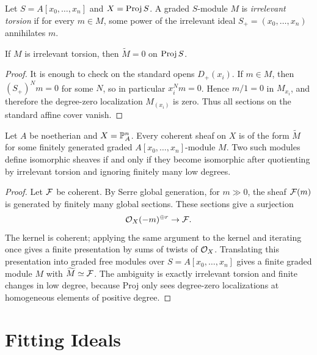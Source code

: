 \begin{definition}
Let \(S=A[x_0,\ldots,x_n]\) and \(X=\operatorname{Proj} S\).  A graded \(S\)-module \(M\) is
\emph{irrelevant torsion} if for every \(m\in M\), some power of the irrelevant
ideal \(S_+=(x_0,\ldots,x_n)\) annihilates \(m\).
\end{definition}

\begin{proposition}
If \(M\) is irrelevant torsion, then \(\widetilde M=0\) on \(\operatorname{Proj} S\).
\end{proposition}

\begin{proof}
It is enough to check on the standard opens \(D_+(x_i)\).  If \(m\in M\), then
\((S_+)^N m=0\) for some \(N\), so in particular \(x_i^Nm=0\).  Hence \(m/1=0\)
in \(M_{x_i}\), and therefore the degree-zero localization \(M_{(x_i)}\) is
zero.  Thus all sections on the standard affine cover vanish.
\end{proof}

\begin{theorem}
Let \(A\) be noetherian and \(X=\mathbb{P}^n_A\).  Every coherent sheaf on \(X\) is of
the form \(\widetilde M\) for some finitely generated graded
\(A[x_0,\ldots,x_n]\)-module \(M\).  Two such modules define isomorphic sheaves
if and only if they become isomorphic after quotienting by irrelevant torsion
and ignoring finitely many low degrees.
\end{theorem}

\begin{proof}
Let \(\mathcal{F}\) be coherent.  By Serre global generation, for \(m\gg0\), the sheaf
\(\mathcal{F}(m)\) is generated by finitely many global sections.  These sections give
a surjection
\[
    \mathcal{O}_X(-m)^{\oplus r}\to\mathcal{F}.
\]
The kernel is coherent; applying the same argument to the kernel and iterating
once gives a finite presentation by sums of twists of \(\mathcal{O}_X\).  Translating
this presentation into graded free modules over \(S=A[x_0,\ldots,x_n]\) gives a
finite graded module \(M\) with \(\widetilde M\simeq\mathcal{F}\).  The ambiguity is
exactly irrelevant torsion and finite changes in low degree, because Proj only
sees degree-zero localizations at homogeneous elements of positive degree.
\end{proof}

\section{Fitting Ideals}

